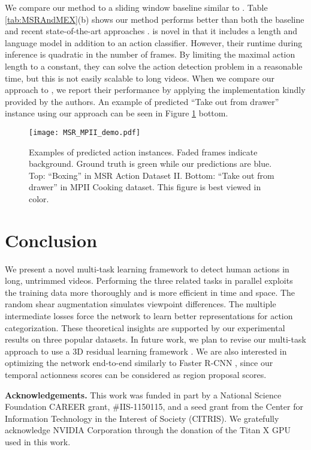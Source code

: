 \documentclass[10pt,twocolumn,letterpaper]{article}
\begin{document}
We compare our method to a sliding window baseline similar to \cite{action_detection_language_richard_cvpr16,MPII_cooking_cvpr12}.
Table \ref{tab:MSRAndMEX}(b) shows our method performs better than both the baseline and recent state-of-the-art approaches \cite{action_detection_language_richard_cvpr16,APT_Gemert_bmvc15}. \cite{action_detection_language_richard_cvpr16} is novel in that it includes a length and language model in addition to an action classifier. 
However, their runtime during inference is quadratic in the number of frames. By limiting the maximal action length to a constant, they can solve the action detection problem in a reasonable time, but this is not easily scalable to long videos. 
When we compare our approach to \cite{APT_Gemert_bmvc15}, we report their performance by applying the implementation kindly provided by the authors. An example of predicted ``Take out from drawer'' instance using our approach can be seen in Figure \ref{fig:MSRandMPII} bottom.

\begin{figure}[t]
	\centering
	\texttt{[image: MSR\_MPII\_demo.pdf]}
	\vspace{-18ex}
	\caption{Examples of predicted action instances. Faded frames indicate background. Ground truth is green while our predictions are blue. Top: ``Boxing'' in MSR Action Dataset II. Bottom: ``Take out from drawer'' in MPII Cooking dataset. This figure is best viewed in color. }
	\label{fig:MSRandMPII}
\end{figure}

\section{Conclusion}
\label{sec:conclusion}
We present a novel multi-task learning framework to detect human actions in long, untrimmed videos. 
Performing the three related tasks in parallel exploits the training data more thoroughly and is more efficient in time and space. The random shear augmentation simulates viewpoint differences. The multiple intermediate losses force the network to learn better representations for action categorization. These theoretical insights are supported by our experimental results on three popular datasets.
In future work, we plan to revise our multi-task approach to use a 3D residual learning framework \cite{residual_cvpr16}. 
We are also interested in optimizing the network end-to-end similarly to Faster R-CNN \cite{fasterRCNN}, since our temporal actionness scores can be considered as region proposal scores. 
\newline

\noindent \textbf{Acknowledgements.} This work was funded in part by a National Science Foundation CAREER grant, $\#$IIS-1150115, and a seed grant from the Center for Information Technology in the Interest of Society (CITRIS). We gratefully acknowledge NVIDIA Corporation through the donation of the Titan X GPU used in this work.

{\small
	
	
}
\end{document}
